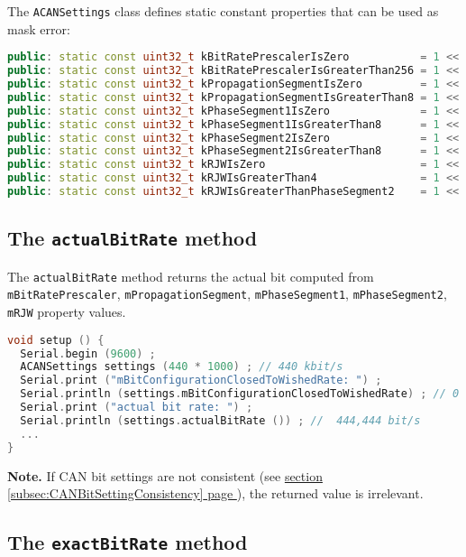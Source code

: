 \documentclass[10pt, a4paper, obeyspaces, openany]{extarticle}
\newcommand \subsectionLabel[2]{\subsection{#1}\label{subsec:#2}}
\newcommand\refSubsectionPage[1]{\hyperref[subsec:#1]{section \ref*{subsec:#1} page \pageref{subsec:#1}}}
\begin{document}
The \texttt{ACANSettings} class defines static constant properties that can be used as mask error:
{ \small\begin{lstlisting}[language=c++]
public: static const uint32_t kBitRatePrescalerIsZero           = 1 <<  0 ;
public: static const uint32_t kBitRatePrescalerIsGreaterThan256 = 1 <<  1 ;
public: static const uint32_t kPropagationSegmentIsZero         = 1 <<  2 ;
public: static const uint32_t kPropagationSegmentIsGreaterThan8 = 1 <<  3 ;
public: static const uint32_t kPhaseSegment1IsZero              = 1 <<  4 ;
public: static const uint32_t kPhaseSegment1IsGreaterThan8      = 1 <<  5 ;
public: static const uint32_t kPhaseSegment2IsZero              = 1 <<  6 ;
public: static const uint32_t kPhaseSegment2IsGreaterThan8      = 1 <<  7 ;
public: static const uint32_t kRJWIsZero                        = 1 <<  8 ;
public: static const uint32_t kRJWIsGreaterThan4                = 1 <<  9 ;
public: static const uint32_t kRJWIsGreaterThanPhaseSegment2    = 1 << 10 ;
\end{lstlisting}}









\subsectionLabel{The \texttt{actualBitRate} method}{actualBitRate}


The \texttt{actualBitRate} method returns the actual bit computed from \texttt{mBitRatePrescaler}, \texttt{mPropagationSegment}, \texttt{mPhaseSegment1}, \texttt{mPhaseSegment2}, \texttt{mRJW} property values.

{ \small\begin{lstlisting}[language=c++]
void setup () {
  Serial.begin (9600) ;
  ACANSettings settings (440 * 1000) ; // 440 kbit/s 
  Serial.print ("mBitConfigurationClosedToWishedRate: ") ;
  Serial.println (settings.mBitConfigurationClosedToWishedRate) ; // 0 (--> is false)
  Serial.print ("actual bit rate: ") ;
  Serial.println (settings.actualBitRate ()) ; //  444,444 bit/s
  ...
}
\end{lstlisting}}

{\bf Note. } If CAN bit settings are not consistent (see \refSubsectionPage{CANBitSettingConsistency}), the returned value is irrelevant.











\subsectionLabel{The \texttt{exactBitRate} method}{exactBitRate}
\end{document}
